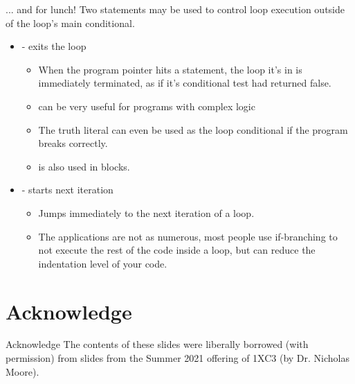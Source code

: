 \documentclass[11pt]{beamer}
\let\OldTexttt\texttt
\renewcommand{\texttt}[1]{\OldTexttt{\color{teal}{#1}}}
\begin{document}
\begin{frame}{\texttt{continue}... and \texttt{break} for lunch!}
Two statements may be used to control loop execution outside of the loop's main conditional.
\begin{itemize}
\item \texttt{break} - exits the loop
\begin{itemize}
	\item When the program pointer hits a \texttt{break} statement, the loop it's in is immediately terminated, as if it's conditional test had returned false.  
	\item \texttt{break} can be very useful for programs with complex logic
	\item The truth literal can even be used as the loop conditional if the program breaks correctly.
	\item \texttt{break} is also used in \texttt{switch case} blocks.
\end{itemize}
\item \texttt{continue} - starts next iteration
\begin{itemize}
\item Jumps immediately to the next iteration of a loop.
\item The applications are not as numerous, most people use if-branching to not execute the rest of the code inside a loop, but \texttt{continue} can reduce the indentation level of your code.  
\end{itemize}
\end{itemize}

\end{frame}



\section[Acknowledge]{Acknowledge}
\begin{frame}{Acknowledge}
\center
\vspace{8em}
The contents of these slides were liberally borrowed (with permission) from slides from the Summer 2021 offering of 1XC3 (by Dr. Nicholas Moore).  
\end{frame}
\end{document}
